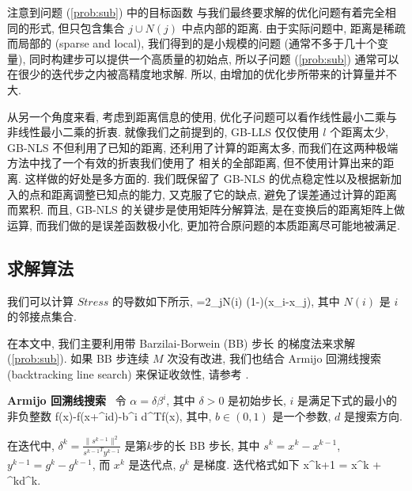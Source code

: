 \documentclass{CASthesis_zzk}
\begin{document}
注意到问题 (\ref{prob:sub}) 中的目标函数
与我们最终要求解的优化问题有着完全相同的形式,
但只包含集合 $j\cup N(j)$ 中点内部的距离.
由于实际问题中, 距离是稀疏而局部的 (sparse and local),
我们得到的是小规模的问题 (通常不多于几十个变量),
同时构建步可以提供一个高质量的初始点,
所以子问题 (\ref{prob:sub}) 通常可以在很少的迭代步之内被高精度地求解.
所以, 由增加的优化步所带来的计算量并不大.

从另一个角度来看, 考虑到距离信息的使用,
优化子问题可以看作线性最小二乘与非线性最小二乘的折衷.
就像我们之前提到的, GB-LLS 仅仅使用 $l$ 个距离\pozhe 太少,
GB-NLS 不但利用了已知的距离, 还利用了计算的距离\pozhe 太多, 
而我们在这两种极端方法中找了一个有效的折衷\pozhe 我们使用了
相关的全部距离, 但不使用计算出来的距离.
这样做的好处是多方面的.
我们既保留了 GB-NLS 的优点\pozhe 稳定性以及根据新加入的点和距离调整已知点的能力,
又克服了它的缺点, 避免了误差通过计算的距离而累积.
而且, GB-NLS 的关键步是使用矩阵分解算法,
是在变换后的距离矩阵上做运算,
而我们做的是误差函数极小化, 
更加符合原问题的本质\pozhe 距离尽可能地被满足.

\subsection{求解算法}
我们可以计算 $Stress$ 的导数如下所示,
\be {}=2\sum_{j\in N(i)} \Big(1-\Big)(x_i-x_j), \label{gradient}\ee
其中 $N(i)$ 是 $i$ 的邻接点集合.

在本文中, 我们主要利用带 Barzilai-Borwein (BB) 步长 \cite{BB1988} 
的梯度法来求解 (\ref{prob:sub}). 
如果 BB 步连续 $M$ 次没有改进, 
我们也结合 Armijo 回溯线搜索 (backtracking line search) 来保证收敛性,
请参考 \cite{Armijo1966,Sun2006}.

\textbf{Armijo 回溯线搜索} ~令 $\alpha = \delta\beta^i$, 
其中 $\delta>0$ 是初始步长, 
$i$ 是满足下式的最小的非负整数
\be f(x)-f(x+\delta\beta^id)\geq -b\delta\beta^i d^T\nabla f(x), \ee
其中, $b\in (0,1)$ 是一个参数, $d$ 是搜索方向.

在迭代中, 
$\delta^k=\frac{\|s^{k-1}\|^2}{{s^{k-1}}^Ty^{k-1}}$ 是第$k$步的长 BB 步长, 
其中 $s^k=x^k-x^{k-1}$, $y^{k-1}=g^k-g^{k-1}$, 而 $x^k$ 是迭代点,
$g^k$ 是梯度. 
迭代格式如下
\be x^{k+1} = x^k + \alpha^kd^k.\ee

\end{document}
